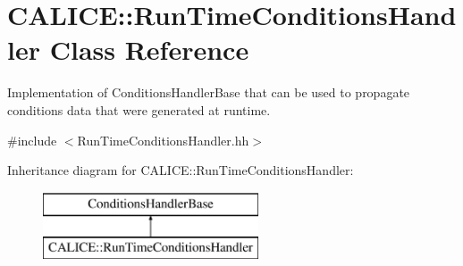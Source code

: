 \section{C\-A\-L\-I\-C\-E\-:\-:Run\-Time\-Conditions\-Handler Class Reference}
\label{classCALICE_1_1RunTimeConditionsHandler}


Implementation of Conditions\-Handler\-Base that can be used to propagate conditions data that were generated at runtime.  




{\ttfamily \#include $<$Run\-Time\-Conditions\-Handler.\-hh$>$}

Inheritance diagram for C\-A\-L\-I\-C\-E\-:\-:Run\-Time\-Conditions\-Handler\-:\begin{figure}[H]
\begin{center}
\leavevmode
\includegraphics[height=2.000000cm]{classCALICE_1_1RunTimeConditionsHandler}
\end{center}
\end{figure}
